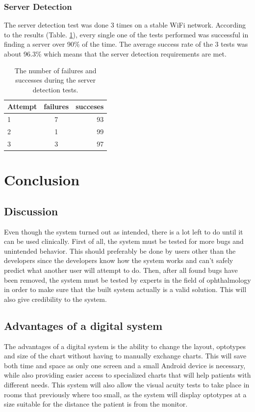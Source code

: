 \documentclass[12pt,a4paper,notitlepage]{report}
\begin{document}
\subsection{Server Detection}
The server detection test was done 3 times on a stable WiFi network. According to the results (Table. \ref{tab:server_detection_test}), every single one of the tests performed was successful in finding a server over 90\% of the time. The average success rate of the 3 tests was about 96.3\% which means that the server detection requirements are met.

\begin{table}[ht!]
\centering
\begin{tabular}{l c r}
Attempt	&	failures	&	succeses	\\
\hline
1	&	7	&	93	\\
2	&	1	&	99	\\
3	&	3	&	97	\\
\end{tabular}
\caption{The number of failures and successes during the server detection tests. \label{tab:server_detection_test}}
\end{table}


\chapter{Conclusion}

\section{Discussion}
Even though the system turned out as intended, there is a lot left to do until it can be used clinically. First of all, the system must be tested for more bugs and unintended behavior. This should preferably be done by users other than the developers since the developers know how the system works and can't safely predict what another user will attempt to do. Then, after all found bugs have been removed, the system must be tested by experts in the field of ophthalmology in order to make sure that the built system actually is a valid solution. This will also give credibility to the system.

\section{Advantages of a digital system}
The advantages of a digital system is the ability to change the layout, optotypes and size of the chart without having to manually exchange charts. This will save both time and space as only one screen and a small Android device is necessary, while also providing easier access to specialized charts that will help patients with different needs. This system will also allow the visual acuity tests to take place in rooms that previously where too small, as the system will display optotypes at a size suitable for the distance the patient is from the monitor.
\end{document}
